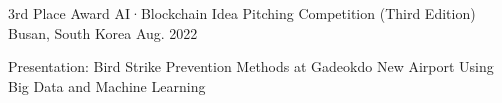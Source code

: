 

\begin{cventries}

  \cventry
  {3rd Place Award} %
  {AI·Blockchain Idea Pitching Competition (Third Edition)} %
  {Busan, South Korea} %
  {Aug. 2022} %
  {
    \begin{cvitems} %
      \item {Presentation: Bird Strike Prevention Methods at Gadeokdo New Airport Using Big Data and Machine Learning}
    \end{cvitems}
  }

\end{cventries}
